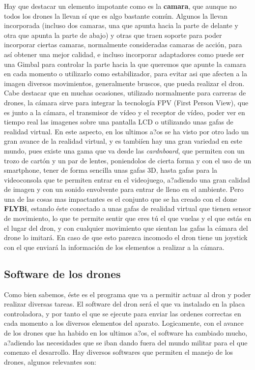 \documentclass{article}
\begin{document}
\hspace{1 cm} Hay que destacar un elemento impotante como es la \textbf{camara}, que aunque no todos los drones la llevan s\'i que es algo bastante com\'un. Algunos la llevan incorporada (incluso dos camaras, una que apunta hacia la parte de delante y otra que apunta la parte de abajo) y otras que traen soporte para poder incorporar ciertas camaras, normalmente consideradas camaras de acci\'on, para as\'i obtener una mejor calidad, e incluso incorporar adaptadores como puede ser una Gimbal para controlar la parte hacia la que queremos que apunte la camara en cada momento o utilizarlo como estabilizador, para evitar asi que afecten a la imagen diversos movimientos, generalmente bruscos, que pueda realizar el dron. Cabe destacar que en muchas ocasiones, utilizado normalmente para carreras de drones, la c\'amara sirve para integrar la tecnolog\'ia FPV (First Person View), que es junto a la c\'amara, el transmisor de v\'ideo y el receptor de v\'ideo, poder ver en tiempo real las imagenes sobre una pantalla LCD o utilizando unas gafas de realidad virtual. En este aspecto, en los ultimos a?os se ha visto por otro lado un gran avance de la realidad virtual, y es tambi\'ien hay una gran variedad en este mundo, pues existe una gama que va desde las \emph{cardnboard}, que permiten con un trozo de cart\'on y un par de lentes, poniendolos de cierta forma y con el uso de un smartphone, tener de forma sencilla unas gafas 3D, hasta gafas para la videoconsola que te permiten entrar en el videojuego, a?adiendo una gran calidad de imagen y con un sonido envolvente para entrar de lleno en el ambiente. Pero una de las cosas mas impactantes es el conjunto que se ha creado con el done \textbf{FLYBi}, estando \'este conectado a unas gafas de realidad virtual que tienen sensor de movimiento, lo que te permite sentir que eres t\'u el que vuelas y el que est\'as en el lugar del dron, y con cualquier movimiento que sientan las gafas la c\'amara del drone lo imitar\'a. En caso de que esto parezca incomodo el dron tiene un joystick con el que enviar\'a la informaci\'on de los elementos a realizar a la c\'amara. 
 
\subsection{Software de los drones}
Como bien sabemos, \'este es el programa que va a permitir actuar al dron y poder realizar diversas tareas. El software del dron ser\'a el que va instalado en la placa controladora, y por tanto el que se ejecute para enviar las ordenes correctas en cada momento a los diversos elementos del aparato. Logicamente, con el avance de los drones que ha habido en los ultimos a?os, el software ha cambiado mucho, a?adiendo las necesidades que se iban dando fuera del mundo militar para el que comenzo el desarrollo. Hay diversos softwares que permiten el manejo de los drones, algunos relevantes son:
\end{document}
